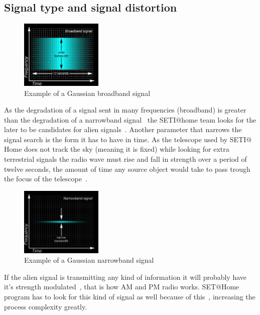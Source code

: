 \subsection{Signal type and signal distortion}\label{hid-sp18-601-subsection-signal}
\begin{figure}[!htb]
        \centering
        \includegraphics[width=0.35\textwidth]{figures/broadband.pdf}
        \caption{Example of a Gaussian broadband
        signal~\cite{hid-sp18-601-www-sathome-howworks}}\label{broadbandfigure}
\end{figure}
As the degradation of a signal sent in many frequencies (broadband) is greater 
than the degradation of a narrowband 
signal~\cite{hid-sp18-601-www-sathome-interference} the SETI$@$home team looks
 for the later to be candidates for alien 
 signals~\cite{hid-sp18-601-www-sathome-howworks}. Another parameter that 
 narrows the signal search is the form it has to have in time. As the telescope 
 used by SETI$@$Home does not track the sky (meaning it is fixed) while looking 
 for extra terrestrial signals the radio wave must rise and fall in strength 
 over a period of twelve seconds, the amount of time any source object would 
 take  to pass trough the focus of the 
 telescope~\cite{hid-sp18-601-www-sathome-interference}.

\begin{figure}[!htb]
        \centering
        \includegraphics[width=0.35\textwidth]{figures/narrow.pdf}
        \caption{Example of a Gaussian narrowband
        signal~\cite{hid-sp18-601-www-sathome-howworks}}\label{broadbandfigure}
\end{figure}
 
 If the alien signal is transmitting any kind of information it will probably 
 have it's strength modulated~\cite{hid-sp18-601-book-gray1961radio}, that is
 how AM and PM radio works. SET$@$Home program has to look for this kind of 
 signal as well because of 
 this~\cite{hid-sp18-601-www-sathome-howworks}, increasing the process 
 complexity greatly.

